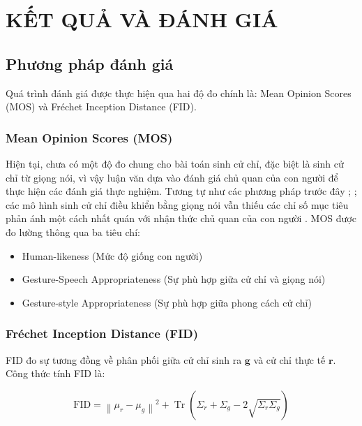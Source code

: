 
\chapter{KẾT QUẢ VÀ ĐÁNH GIÁ}
\label{chap:evalution}

\section{Phương pháp đánh giá}

Quá trình đánh giá được thực hiện qua hai độ đo chính là: Mean Opinion Scores (MOS) và Fréchet Inception Distance (FID).

\subsection{Mean Opinion Scores (MOS)}

Hiện tại, chưa có một độ đo chung cho bài toán sinh cử chỉ, đặc biệt là sinh cử chỉ từ giọng nói, vì vậy luận văn dựa vào đánh giá chủ quan của con người để thực hiện các đánh giá thực nghiệm. 
Tương tự như các phương pháp trước đây \cite{yoon2022genea}; \cite{kucherenko2021large}; các mô hình sinh cử chỉ điều khiển bằng giọng nói vẫn thiếu các chỉ số mục tiêu phản ánh một cách nhất quán với nhận thức chủ quan của con người  \cite{alexanderson2022listen}.
MOS được đo lường thông qua ba tiêu chí:

\begin{itemize}
	\item Human-likeness (Mức độ giống con người)
	\item Gesture-Speech Appropriateness (Sự phù hợp giữa cử chỉ và giọng nói)
	\item Gesture-style Appropriateness (Sự phù hợp giữa phong cách cử chỉ)
\end{itemize}


\subsection{Fréchet Inception Distance (FID)}
FID đo sự tương đồng về phân phối giữa cử chỉ sinh ra $\mathbf{g}$ và cử chỉ thực tế $\mathbf{r}$. Công thức tính FID là:

\begin{equation}
	\text{FID} = \left\| \mu_r - \mu_g \right\|^2 + \operatorname{Tr}\left( \Sigma_r + \Sigma_g - 2 \sqrt{\Sigma_r \Sigma_g} \right)
\end{equation}



